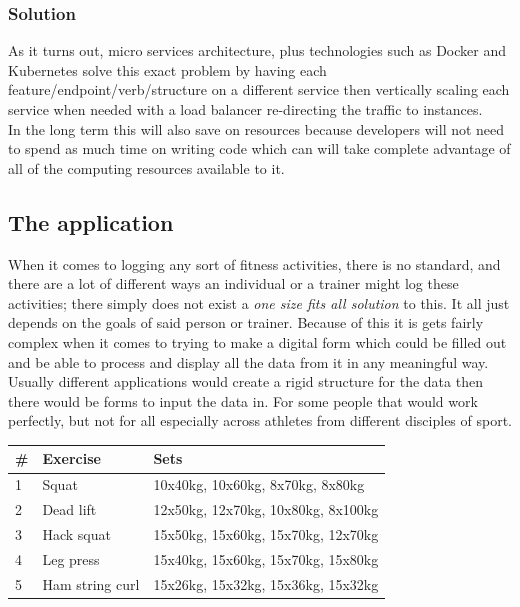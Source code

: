 \documentclass{article}
\newcommand{\vspaceconst}{-2ex}
\begin{document}
\begin{multicols}{2}
\subsubsection{Solution}
\vspace{\vspaceconst}
As it turns out, micro services architecture, plus technologies such as Docker and Kubernetes solve this exact problem by having each feature/endpoint/verb/structure on a different service then vertically scaling each service when needed with a load balancer re-directing the traffic to instances.\\
In the long term this will also save on resources because developers will not need to spend as much time on writing code which can will take complete advantage of all of the computing resources available to it.\\

\subsection{The application}
\vspace{\vspaceconst}

When it comes to logging any sort of fitness activities, there is no standard, and there are a lot of different ways an individual or a trainer might log these activities; there simply does not exist a \textit{one size fits all solution} to this. It all just depends on the goals of said person or trainer. Because of this it is gets fairly complex when it comes to trying to make a digital form which could be filled out and be able to process and display all the data from it in any meaningful way. Usually different applications would create a rigid structure for the data then there would be forms to input the data in. For some people that would work perfectly, but not for all especially across athletes from different disciples of sport.\\

\begingroup
\centering
\begin{tabular}{l l p{3cm}}
  \toprule
  \# & Exercise & Sets \\ [0.5ex]
  \midrule
  1 & Squat & 10x40kg, 10x60kg, 8x70kg, 8x80kg\\
  \midrule
  2 & Dead lift & 12x50kg, 12x70kg, 10x80kg, 8x100kg\\
  \midrule
  3 & Hack squat & 15x50kg, 15x60kg, 15x70kg, 12x70kg\\
  \midrule
  4 & Leg press & 15x40kg, 15x60kg, 15x70kg, 15x80kg\\
  \midrule
  5 & Ham string curl & 15x26kg, 15x32kg, 15x36kg, 15x32kg\\
  \bottomrule
\end{tabular}
~\label{table:WorkoutLogExample1}
\endgroup


\end{multicols}
\end{document}
